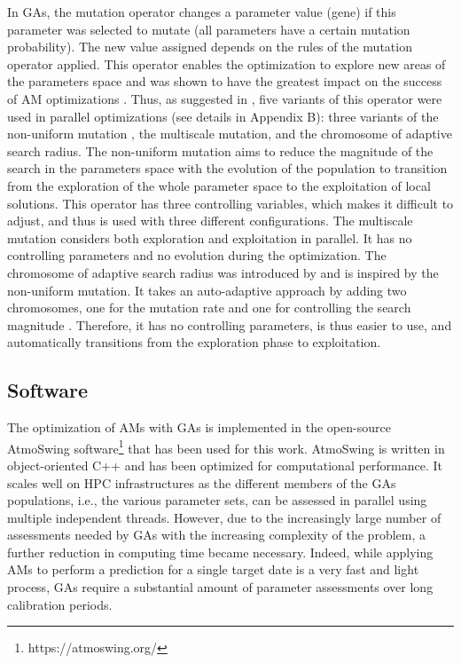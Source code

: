\documentclass[draft]{agujournal2019}
\begin{document}
In GAs, the mutation operator changes a parameter value (gene) if this parameter was selected to mutate (all parameters have a certain mutation probability). The new value assigned depends on the rules of the mutation operator applied. This operator enables the optimization to explore new areas of the parameters space and was shown to have the greatest impact on the success of AM optimizations \cite{Horton2017a}. Thus, as suggested in , five variants of this operator were used in parallel optimizations (see details in Appendix B): three variants of the non-uniform mutation \cite{Michalewicz1996}, the multiscale mutation, and the chromosome of adaptive search radius. The non-uniform mutation aims to reduce the magnitude of the search in the parameters space with the evolution of the population to transition from the exploration of the whole parameter space to the exploitation of local solutions. This operator has three controlling variables, which makes it difficult to adjust, and thus is used with three different configurations. The multiscale mutation considers both exploration and exploitation in parallel. It has no controlling parameters and no evolution during the optimization. The chromosome of adaptive search radius was introduced by  and is inspired by the non-uniform mutation. It takes an auto-adaptive approach by adding two chromosomes, one for the mutation rate and one for controlling the search magnitude \cite<see details in>{Horton2017a}. Therefore, it has no controlling parameters, is thus easier to use, and automatically transitions from the exploration phase to exploitation.


\subsection{Software}
\label{software}

The optimization of AMs with GAs is implemented in the open-source AtmoSwing software\footnote{https://atmoswing.org/} \cite{Horton2019} that has been used for this work. AtmoSwing is written in object-oriented C++ and has been optimized for computational performance. It scales well on HPC infrastructures as the different members of the GAs populations, i.e., the various parameter sets, can be assessed in parallel using multiple independent threads. However, due to the increasingly large number of assessments needed by GAs with the increasing complexity of the problem, a further reduction in computing time became necessary. Indeed, while applying AMs to perform a prediction for a single target date is a very fast and light process, GAs require a substantial amount of parameter assessments over long calibration periods.
\end{document}
